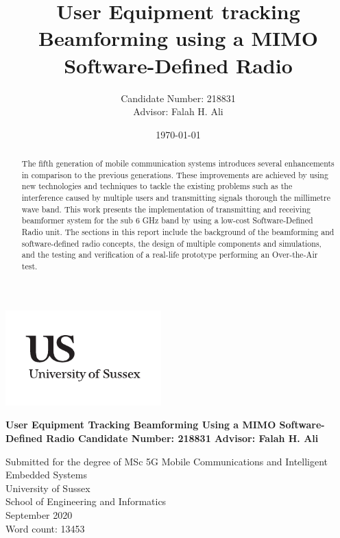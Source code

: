 \documentclass[12pt,a4paper]{report}
\title{\bf{User Equipment tracking Beamforming using a MIMO Software-Defined Radio}}
\author{Candidate Number: 218831\\[1cm]{\small Advisor: Falah H. Ali}}
\date{\today}
\begin{document}
\begin{titlepage}
\begin{flushright}
\includegraphics[width=6cm]{Figures/uslogo}
\end{flushright}	
\vskip40mm
\begin{center}
\huge\bf{User Equipment Tracking Beamforming Using a MIMO Software-Defined Radio}
\vskip2mm
\LARGE Candidate Number: 218831
\vskip5mm
\Large Advisor: Falah H. Ali
\normalsize
\end{center}
\vfill
\begin{flushleft}
\large
Submitted for the degree of MSc 5G Mobile Communications and Intelligent Embedded Systems \\
University of Sussex	\\
School of Engineering and Informatics \\

September 2020 \\ 
Word count: 13453
\end{flushleft}	\end{titlepage}


\begin{abstract}
    The fifth generation of mobile communication systems introduces several enhancements in comparison to the previous generations. These improvements are achieved by using new technologies and techniques to tackle the existing problems such as the interference caused by multiple users and transmitting signals thorough the millimetre wave band. This work presents the implementation of transmitting and receiving beamformer system for the sub 6 GHz band by using a low-cost Software-Defined Radio unit. The sections in this report include the background of the beamforming and software-defined radio concepts, the design of multiple components and simulations, and the testing and verification of a real-life prototype performing an Over-the-Air test.
\end{abstract}
\end{document}
